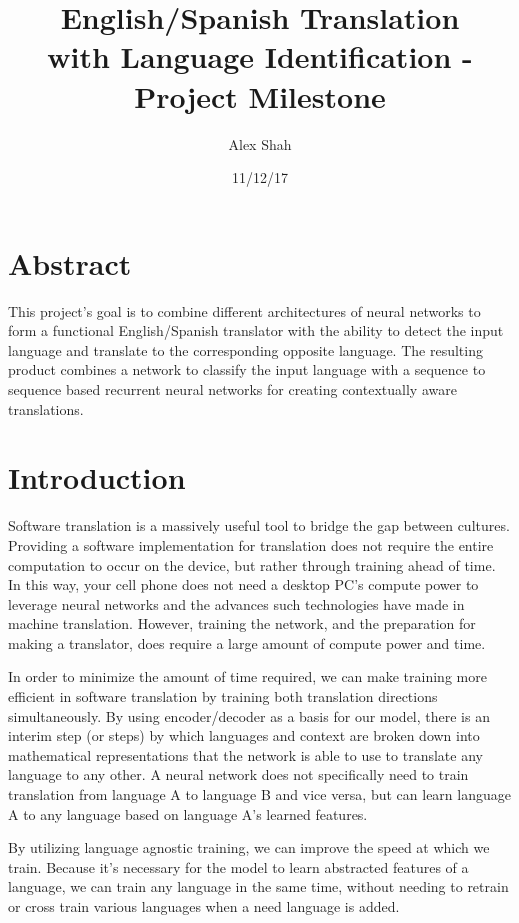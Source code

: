 \documentclass[10pt,a4paper]{report}
\begin{document}
\title{English/Spanish Translation \\ with Language Identification - \\ Project Milestone}
\author{Alex Shah}
\date{11/12/17}

\maketitle

\section{Abstract}

  This project's goal is to combine different architectures of neural networks to form a functional English/Spanish translator with the ability to detect the input language and translate to the corresponding opposite language. The resulting product combines a network to classify the input language with a sequence to sequence based recurrent neural networks for creating contextually aware translations.

\section{Introduction}

  Software translation is a massively useful tool to bridge the gap between cultures. Providing a software implementation for translation does not require the entire computation to occur on the device, but rather through training ahead of time. In this way, your cell phone does not need a desktop PC's compute power to leverage neural networks and the advances such technologies have made in machine translation. However, training the network, and the preparation for making a translator, does require a large amount of compute power and time.

  In order to minimize the amount of time required, we can make training more efficient in software translation by training both translation directions simultaneously. By using encoder/decoder as a basis for our model, there is an interim step (or steps) by which languages and context are broken down into mathematical representations that the network is able to use to translate any language to any other. A neural network does not specifically need to train translation from language A to language B and vice versa, but can learn language A to any language based on language A's learned features. 

	By utilizing language agnostic training, we can improve the speed at which we train. Because it's necessary for the model to learn abstracted features of a language, we can train any language in the same time, without needing to retrain or cross train various languages when a need language is added.
\end{document}
